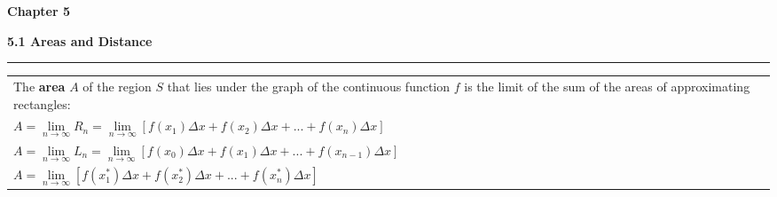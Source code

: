 \documentclass[fleqn]{article}
\begin{document}
\Huge\textbf{Chapter 5}
\vspace{16pt}

\begin{center}
\Large\textbf{5.1 Areas and Distance}

\noindent\hfill\rule{0.3\textwidth}{.4pt}\hfill
\vspace{12pt}

\large
\def\arraystretch{1.3}
{\setlength{\tabcolsep}{16pt}
\begin{tabularx}{.9\textwidth}{|X|}
\hline
	\vspace{1pt}
	The \textbf{area} $A$ of the region $S$ that lies under the graph of the continuous function $f$ is the limit of the sum of the areas of approximating rectangles: \\[10pt]

	$A = \underset{n \to \infty}{\lim} R_n = \underset{n \to \infty}{\lim} [f(x_1) \Delta x + f(x_2) \Delta x + ... + f(x_n) \Delta x]$ \\[10pt]
	$A = \underset{n \to \infty}{\lim} L_n = \underset{n \to \infty}{\lim} [f(x_0) \Delta x + f(x_1) \Delta x + ... + f(x_{n-1}) \Delta x]$ \\[10pt]
	$A = \underset{n \to \infty}{\lim} [f(x_1^*) \Delta x + f(x_2^*) \Delta x + ... + f(x_n^*) \Delta x]$ \\[16pt]
\hline
\end{tabularx}}
\vspace{12pt}


\end{center}
\end{document}

